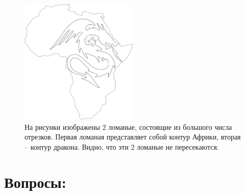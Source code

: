 \documentclass{article}
\begin{document}
\begin{figure}[H]
  \centering
      \includegraphics[width=0.5\textwidth]{images/test1_africa_dragon.png}
  \caption{На рисунки изображены 2 ломаные, состоящие из большого числа отрезков. Первая ломаная представляет собой контур Африки, вторая -- контур дракона. Видно, что эти 2 ломаные не пересекаются.}
\end{figure}

\iffalse
\section*{Вопросы:}
\end{document}
